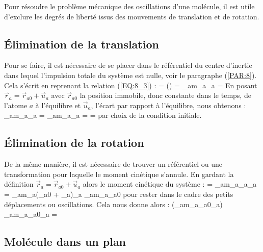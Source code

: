 Pour r\'esoudre le probl\`eme m\'ecanique des oscillations d'une mol\'ecule, il est utile d'exclure les degr\'es de libert\'e issus des mouvements de translation et de rotation.

\subsection{\'Elimination de la translation}

Pour se faire, il est n\'ecessaire de se placer dans le r\'ef\'erentiel du centre d'inertie dans lequel l'impulsion totale du syst\`eme est nulle, voir le paragraphe (\ref{PAR:8}). Cela s'\'ecrit en reprenant la relation (\ref{EQ:8_3}) :
\benn
	 = \left(\right) =  \Leftrightarrow \sum_{a}m_{a}_{a} = 
\eenn
En posant $\vec{r}_{a} = \vec{r}_{a0} + \vec{u}_{a}$ avec $\vec{r}_{a0}$ la position immobile, donc constante dans le temps, de l'atome $a$ \`a l'\'equilibre et $\vec{u}_{a}$, l'\'ecart par rapport \`a l'\'equilibre, nous obtenons :
\be
	\sum_{a}m_{a}_{a} =  \Leftrightarrow \sum_{a}m_{a}_{a} =  =  \label{EQ:24_1}
\ee
par choix de la condition initiale.

\subsection{\'Elimination de la rotation}

De la m\^eme mani\`ere, il est n\'ecessaire de trouver un r\'ef\'erentiel ou une transformation pour laquelle le moment cin\'etique s'annule. En gardant la d\'efinition $\vec{r}_{a} = \vec{r}_{a0} + \vec{u}_{a}$ alors le moment cin\'etique du syst\`eme :
\benn
	 = \sum_{a}m_{a}_{a}\wedge{}_{a} = \sum_{a}m_{a}(_{a0} + _{a})\wedge{}_{a} \approx \sum_{a}m_{a}_{a0}\wedge{}
\eenn
pour rester dans le cadre des petits d\'eplacements ou oscillations. Cela nous donne alors :
\be
	 \approx {}\left(\sum_{a}m_{a}_{a0}\wedge{}_{a}\right) \Rightarrow \sum_{a}m_{a}_{a0}\wedge{}_{a} =  \label{EQ:24_2}
\ee

\subsection{Mol\'ecule dans un plan}

